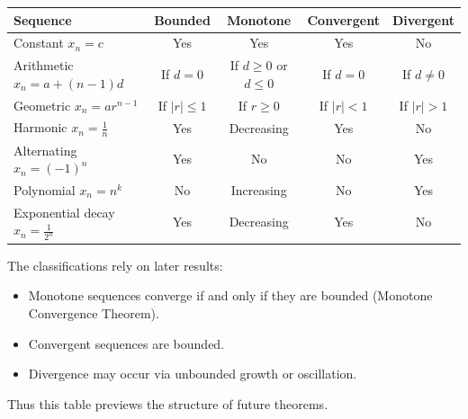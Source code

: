 \begin{center}
\renewcommand{\arraystretch}{1.2}
\begin{tabular}{|l|c|c|c|c|}
\hline
\textbf{Sequence} 
& \textbf{Bounded} 
& \textbf{Monotone} 
& \textbf{Convergent} 
& \textbf{Divergent} \\
\hline

Constant $x_n = c$ 
& Yes 
& Yes 
& Yes 
& No \\

Arithmetic $x_n = a+(n-1)d$ 
& If $d=0$ 
& If $d\ge0$ or $d\le0$ 
& If $d=0$ 
& If $d\ne0$ \\

Geometric $x_n = ar^{n-1}$ 
& If $|r|\le1$ 
& If $r\ge0$ 
& If $|r|<1$ 
& If $|r|>1$ \\

Harmonic $x_n=\frac1n$ 
& Yes 
& Decreasing 
& Yes 
& No \\

Alternating $x_n=(-1)^n$ 
& Yes 
& No 
& No 
& Yes \\

Polynomial $x_n=n^k$ 
& No 
& Increasing 
& No 
& Yes \\

Exponential decay $x_n=\frac1{2^n}$ 
& Yes 
& Decreasing 
& Yes 
& No \\

\hline
\end{tabular}
\end{center}

\begin{remark}
The classifications rely on later results:

\begin{itemize}
\item Monotone sequences converge if and only if they are bounded
      (Monotone Convergence Theorem).
\item Convergent sequences are bounded.
\item Divergence may occur via unbounded growth or oscillation.
\end{itemize}

Thus this table previews the structure of future theorems.
\end{remark}


